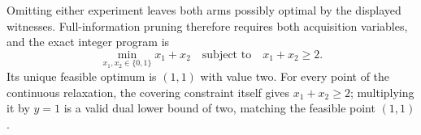 Omitting either experiment leaves both arms possibly optimal by the displayed witnesses. Full-information pruning therefore requires both acquisition variables, and the exact integer program is
\[
\min_{x_1,x_2\in\{0,1\}}x_1+x_2
\quad\text{subject to}\quad x_1+x_2\geq2.
\]
Its unique feasible optimum is \((1,1)\) with value two. For every point of the continuous relaxation, the covering constraint itself gives \(x_1+x_2\geq2\); multiplying it by \(y=1\) is a valid dual lower bound of two, matching the feasible point \((1,1)\).